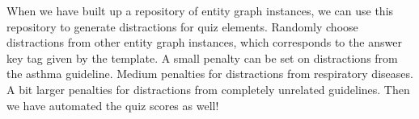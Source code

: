 
When we have built up a repository of entity graph instances, we can use this repository to generate distractions for quiz elements. Randomly choose distractions from other entity graph instances, which corresponds to the answer key tag given by the template. A small penalty can be set on distractions from the asthma guideline. Medium penalties for distractions from respiratory diseases. A bit larger penalties for distractions from completely unrelated guidelines. Then we have automated the quiz scores as well!




  

